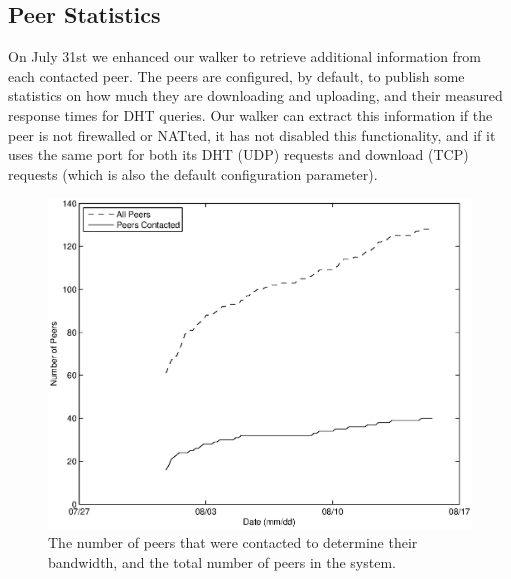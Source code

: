 \documentclass[conference]{IEEEtran}
\begin{document}
% 

\subsection{Peer Statistics}
\label{peer_stats}

On July 31st we enhanced our walker to retrieve additional
information from each contacted peer. The peers are configured, by
default, to publish some statistics on how much they are downloading
and uploading, and their measured response times for DHT queries.
Our walker can extract this information if the peer is not
firewalled or NATted, it has not disabled this functionality, and if
it uses the same port for both its DHT (UDP) requests and download
(TCP) requests (which is also the default configuration parameter).

\begin{figure}
\centering
\includegraphics[width=0.80\columnwidth]{AptP2PDownloaded-peers.eps}
\caption{The number of peers that were contacted to determine their
bandwidth, and the total number of peers in the system.}
\label{down_peers}
\end{figure}
\end{document}
